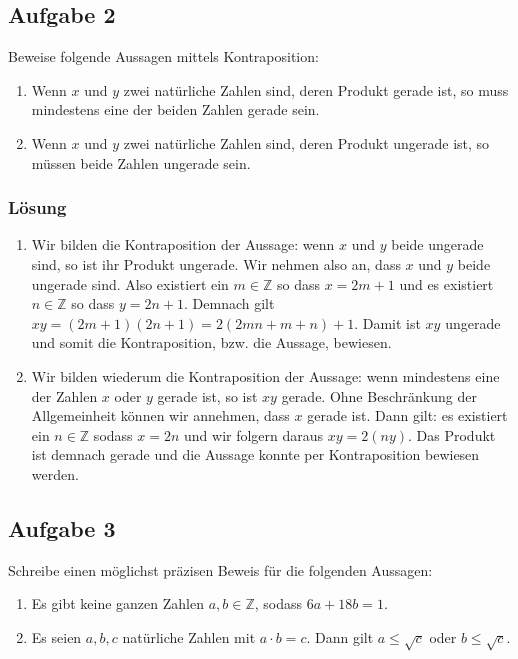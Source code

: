 \documentclass[a4paper,10pt]{article}
\newcommand{\Z}{\mathbb{Z}}
\newcommand{\s}[1]{#1}
\begin{document}
\subsection*{Aufgabe 2}

Beweise folgende Aussagen mittels Kontraposition:
\begin{enumerate}[label=(\alph*)]
    \item Wenn $x$ und $y$ zwei natürliche Zahlen sind, deren Produkt gerade ist, so muss mindestens eine der beiden Zahlen gerade sein.
    \item Wenn $x$ und $y$ zwei natürliche Zahlen sind, deren Produkt ungerade ist, so müssen beide Zahlen ungerade sein.
\end{enumerate}

\s{\subsubsection*{Lösung}
\begin{enumerate}[label=(\alph*)]
    \item Wir bilden die Kontraposition der Aussage: wenn $x$ und $y$ beide ungerade sind, so ist ihr Produkt ungerade. Wir nehmen also an, dass $x$ und $y$ beide ungerade sind. Also existiert ein $m\in \Z$ so dass $x=2m+1$ und es existiert $n \in \Z$ so dass $y=2n+1$. Demnach gilt $xy= (2m+1)(2n+1) = 2(2mn+m+n)+1$. Damit ist $xy$ ungerade und somit die Kontraposition, bzw. die Aussage, bewiesen.
    \item Wir bilden wiederum die Kontraposition der Aussage: wenn mindestens eine der Zahlen $x$ oder $y$ gerade ist, so ist $xy$ gerade. Ohne Beschränkung der Allgemeinheit können wir annehmen, dass $x$ gerade ist. Dann gilt: es existiert ein $n\in \Z$ sodass $x=2n$ und wir folgern daraus $xy=2(ny)$. Das Produkt ist demnach gerade und die Aussage konnte per Kontraposition bewiesen werden.
\end{enumerate}
}


\subsection*{Aufgabe 3}

Schreibe einen möglichst präzisen Beweis für die folgenden Aussagen:
\begin{enumerate}[label=(\alph*)]
    \item Es gibt keine ganzen Zahlen $a,b \in \mathbb{Z}$, sodass $6a+18b=1$.
    \item Es seien $a,b,c$ natürliche Zahlen mit $a\cdot b = c$. Dann gilt $a \le \sqrt{c}$ oder $b \le \sqrt{c}$.
\end{enumerate}
\end{document}
